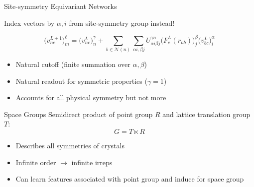 \documentclass[11pt]{beamer}
\begin{document}
\begin{frame}{Site-symmetry Equivariant Networks}
\begin{center}
	Index vectors by $\alpha ,i$  from site-symmetry group instead!
\end{center}
{\small
	$$
	\big(v^{L+1}_{nc}\big) ^{\ell}_{m}=\big(v^{L}_{nc}\big)^{\gamma}_n+\sum_{b\in \mathcal{N}(n)}\sum_{\alpha i, \beta j}U_{\alpha i \beta j}^{\gamma n}\big(F^{L}_c(r_{nb})\big)^{\beta }_{j}\big(v_{bc}^L \big)^{\alpha}_{i}
	$$}
	
\begin{itemize}
	\item Natural cutoff (finite summation over $\alpha,\beta$)
	\item Natural readout for symmetric properties ($\gamma=1$)
	\item Accounts for all physical symmetry but not more
\end{itemize}

\end{frame}


\begin{frame}{Space Groups}
Semidirect product of point group $R$ and lattice translation group $T$:
$$
G = T\ltimes R
$$
\begin{itemize}
	\item Describes all symmetries of crystals
	\item Infinite order $\rightarrow$ infinite irreps
	\item Can learn features associated with point group and induce for space group
\end{itemize}

\end{frame}
\end{document}
